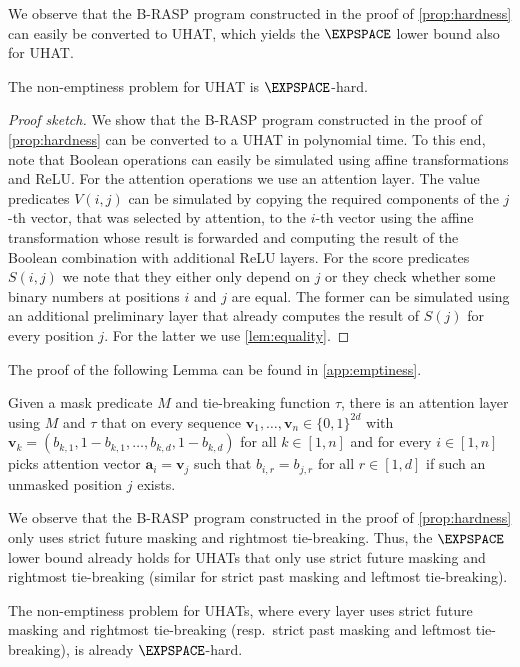 We observe that the B-RASP program constructed in the proof of \cref{prop:hardness} can easily be converted to UHAT,
which yields the $\EXPSPACE$ lower bound also for UHAT.
\begin{proposition}\label{prop:UHAT-hardness}
The non-emptiness problem for UHAT is $\EXPSPACE$-hard.
\end{proposition}
\begin{proof}[Proof sketch]
We show that the B-RASP program constructed in the proof of \cref{prop:hardness} can be converted to a UHAT in polynomial time.
To this end, note that Boolean operations can easily be simulated using affine transformations and ReLU.
For the attention operations we use an attention layer.
The value predicates $V(i,j)$ can be simulated by copying the required components of the $j$-th vector,
that was selected by attention, to the $i$-th vector using the affine transformation whose result is forwarded 
and computing the result of the Boolean combination with additional ReLU layers.
For the score predicates $S(i,j)$ we note that they either only depend on $j$ 
or they check whether some binary numbers at positions $i$ and $j$ are equal.
The former can be simulated using an additional preliminary layer that already computes the result of $S(j)$ for every position $j$.
For the latter we use \cref{lem:equality}.
\end{proof}

The proof of the following Lemma can be found in \cref{app:emptiness}.
\begin{lemma}\label{lem:equality}
Given a mask predicate $M$ and tie-breaking function $\tau$,
there is an attention layer using $M$ and $\tau$ that on every sequence $\bm v_1,\dots,\bm v_n \in \{0,1\}^{2d}$
with $\bm v_k = (b_{k,1},1-b_{k,1},\dots,b_{k,d},1-b_{k,d})$ for all $k \in [1,n]$
and for every $i \in [1,n]$ picks attention vector $\bm a_i = \bm v_j$ such that
$b_{i,r} = b_{j,r}$ for all $r \in [1,d]$
if such an unmasked position $j$ exists.
\end{lemma}

We observe that the B-RASP program constructed in the proof of \cref{prop:hardness} 
only uses strict future masking and rightmost tie-breaking.
Thus, the $\EXPSPACE$ lower bound already holds for UHATs that only use strict future masking and rightmost tie-breaking
(similar for strict past masking and leftmost tie-breaking).
\begin{corollary}
The non-emptiness problem for UHATs, where every layer uses strict future masking and rightmost tie-breaking
(resp.\ strict past masking and leftmost tie-breaking), is already $\EXPSPACE$-hard.
\end{corollary}

